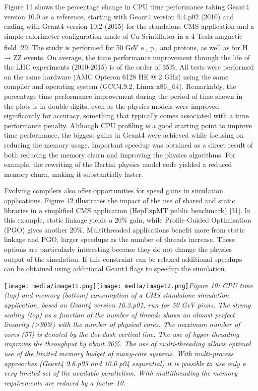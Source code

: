 \documentclass[12pt,a4paper]{article}
\begin{document}
Figure 11 shows the percentage change in CPU time performance taking
Geant4 version 10.0 as a reference, starting with Geant4 version 9.4.p02
(2010) and ending with Geant4 version 10.2 (2015) for the standalone CMS
application and a simple calorimeter configuration made of
Cu-Scintillator in a 4 Tesla magnetic field {[}29{]}.The study is
performed for 50 GeV e\textsuperscript{-}, p\textsuperscript{-}, and
protons, as well as for H → ZZ events. On average, the time performance
improvement through the life of the LHC experiments (2010-2015) is of
the order of 35\%. All tests were performed on the same hardware (AMC
Opteron 6128 HE @ 2 GHz) using the same compiler and operating system
(GCC4.9.2, Linux x86\_64). Remarkably, the percentage time performance
improvement during the period of time shown in the plots is in double
digits, even as the physics models were improved significantly for
accuracy, something that typically comes associated with a time
performance penalty. Although CPU profiling is a good starting point to
improve time performance, the biggest gains in Geant4 were achieved
while focusing on reducing the memory usage. Important speedup was
obtained as a direct result of both reducing the memory churn and
improving the physics algorithms. For example, the rewriting of the
Bertini physics model code yielded a reduced memory churn, making it
substantially faster.

Evolving compilers also offer opportunities for speed gains in
simulation applications. Figure 12 illustrates the impact of the use of
shared and static libraries in a simplified CMS application (HepExpMT
public benchmark) {[}31{]}. In this example, static linkage yields a
20\% gain, while Profile-Guided Optimisation (PGO) gives another 20\%.
Multithreaded applications benefit more from static linkage and PGO,
larger speedups as the number of threads increase. These options are
particularly interesting because they do not change the physics output
of the simulation. If this constraint can be relaxed additional speedups
can be obtained using additional Geant4 flags to speedup the simulation.

\texttt{[image: media/image11.png]}\texttt{[image: media/image12.png]}\emph{Figure
10: CPU time (top) and memory (bottom) consumption of a CMS standalone
simulation application, based on Geant4 version 10.3.p01, run for 50 GeV
pions. The strong scaling (top) as a function of the number of threads
shows an almost perfect linearity (\textgreater{}90\%) with the number
of physical cores. The maximum number of cores (57) is denoted by the
dot-dash vertical line. The use of hyper-threading improves the
throughput by about 30\%. The use of multi-threading allows optimal use
of the limited memory budget of many-core systems. With multi-process
approaches (Geant4 9.6.p03 and 10.0.p04 sequential) it is possible to
use only a very limited set of the available parallelism. With
multithreading the memory requirements are reduced by a factor 10.}
\end{document}
